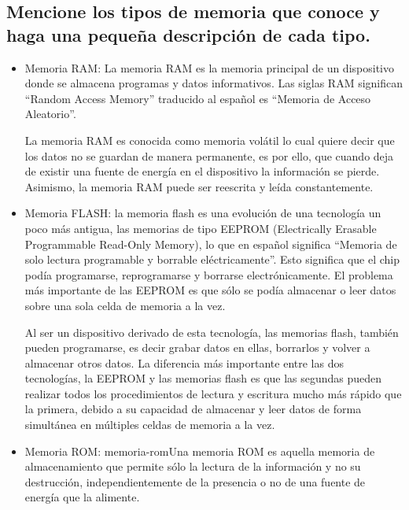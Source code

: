 \documentclass{article}
\begin{document}
\subsection{Mencione los tipos de memoria que conoce y haga una pequeña descripción de cada tipo.}
\begin{itemize}
    \item     Memoria RAM: La memoria RAM es la memoria principal de un dispositivo donde se almacena programas y datos informativos. Las siglas RAM significan “Random Access Memory” traducido al español es “Memoria de Acceso Aleatorio”\cite{RAM}.

La memoria RAM es conocida como memoria volátil lo cual quiere decir que los datos no se guardan de manera permanente, es por ello, que cuando deja de existir una fuente de energía en el dispositivo la información se pierde. Asimismo, la memoria RAM puede ser reescrita y leída constantemente.
    \item     Memoria FLASH: la memoria flash es una evolución de una tecnología un poco más antigua, las memorias de tipo EEPROM (Electrically Erasable Programmable Read-Only Memory), lo que en español significa “Memoria de solo lectura programable y borrable eléctricamente”. Esto significa que el chip podía programarse, reprogramarse y borrarse electrónicamente. El problema más importante de las EEPROM es que sólo se podía almacenar o leer datos sobre una sola celda de memoria a la vez.
    
    \vspace{0.5cm}
    \noindent
    Al ser un dispositivo derivado de esta tecnología, las memorias flash, también pueden programarse, es decir grabar datos en ellas, borrarlos y volver a almacenar otros datos. La diferencia más importante entre las dos tecnologías, la EEPROM y las memorias flash es que las segundas pueden realizar todos los procedimientos de lectura y escritura mucho más rápido que la primera, debido a su capacidad de almacenar y leer datos de forma simultánea en múltiples celdas de memoria a la vez.\cite{flash}
    \item     Memoria ROM: 
memoria-romUna memoria ROM es aquella memoria de almacenamiento que permite sólo la lectura de la información y no su destrucción, independientemente de la presencia o no de una fuente de energía que la alimente.


\end{itemize}
\end{document}
